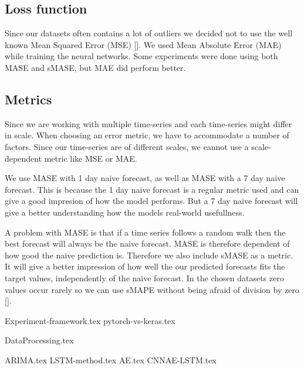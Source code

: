 \subsection*{Loss function}
Since our datasets often contains a lot of outliers we decided not to use the well known
Mean Squared Error (MSE) [].
We used Mean Absolute Error (MAE) while training the neural networks.
Some experiments were done using both MASE and sMASE, but MAE did perform better.

\subsection*{Metrics}
Since we are working with multiple time-series and each time-series might differ in scale.
When choosing an error metric, we have to accommodate a number of factors.
Since our time-series are of different scales, we cannot use a scale-dependent metric
like MSE or MAE.


We use MASE with 1 day naive forecast, as well as MASE with a 7 day
naive forecast. This is because the 1 day naive forecast is a regular metric used
and can give a good impresion of how the model performs. But a 7 day naive forecast
will give a better understanding how the models real-world usefullness.

A problem with MASE is that if a time series follows a random walk
then the best forecast will always be the naive forecast. MASE is therefore dependent of
how good the naive prediction is.
Therefore we also include sMASE as a metric. It will give a better impression
of how well the our predicted forecasts fits the target values, independently of
the naive forecast. In the chosen datasets zero values occur rarely so we can use sMAPE without
being afraid of division by zero [].


{Experiment-framework.tex}
{pytorch-vs-keras.tex}

{DataProcessing.tex}


{ARIMA.tex}
{LSTM-method.tex}
{AE.tex}
{CNNAE-LSTM.tex}
